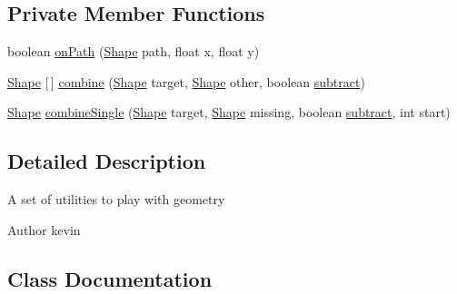 \subsection*{Private Member Functions}
\begin{DoxyCompactItemize}
\item 
boolean \mbox{\hyperlink{classorg_1_1newdawn_1_1slick_1_1geom_1_1_geom_util_aa1a89ad4cb34e2520cfbd7f1514637ff}{on\+Path}} (\mbox{\hyperlink{classorg_1_1newdawn_1_1slick_1_1geom_1_1_shape}{Shape}} path, float x, float y)
\item 
\mbox{\hyperlink{classorg_1_1newdawn_1_1slick_1_1geom_1_1_shape}{Shape}} \mbox{[}$\,$\mbox{]} \mbox{\hyperlink{classorg_1_1newdawn_1_1slick_1_1geom_1_1_geom_util_a3f61c5128808d5737d963c353910d3e5}{combine}} (\mbox{\hyperlink{classorg_1_1newdawn_1_1slick_1_1geom_1_1_shape}{Shape}} target, \mbox{\hyperlink{classorg_1_1newdawn_1_1slick_1_1geom_1_1_shape}{Shape}} other, boolean \mbox{\hyperlink{classorg_1_1newdawn_1_1slick_1_1geom_1_1_geom_util_a4c08d4344876c0f7225933783a26a56a}{subtract}})
\item 
\mbox{\hyperlink{classorg_1_1newdawn_1_1slick_1_1geom_1_1_shape}{Shape}} \mbox{\hyperlink{classorg_1_1newdawn_1_1slick_1_1geom_1_1_geom_util_a3aea00a7563f7885b2eadff26ec37014}{combine\+Single}} (\mbox{\hyperlink{classorg_1_1newdawn_1_1slick_1_1geom_1_1_shape}{Shape}} target, \mbox{\hyperlink{classorg_1_1newdawn_1_1slick_1_1geom_1_1_shape}{Shape}} missing, boolean \mbox{\hyperlink{classorg_1_1newdawn_1_1slick_1_1geom_1_1_geom_util_a4c08d4344876c0f7225933783a26a56a}{subtract}}, int start)
\end{DoxyCompactItemize}


\subsection{Detailed Description}
A set of utilities to play with geometry

\begin{DoxyAuthor}{Author}
kevin 
\end{DoxyAuthor}


\subsection{Class Documentation}
\label{classorg_1_1newdawn_1_1slick_1_1geom_1_1_geom_util_1_1_hit_result}
